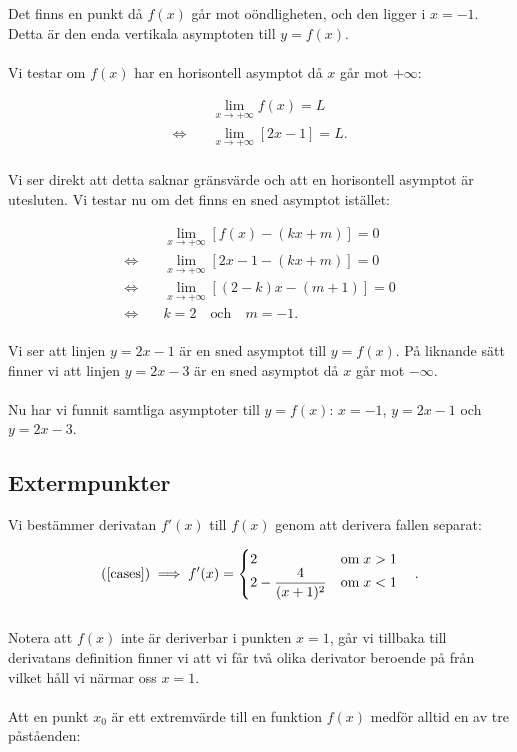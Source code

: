\documentclass{article}
\begin{document}
\noindent Det finns en punkt då $f(x)$ går mot oöndligheten, och den ligger i $x = -1$. Detta är den enda vertikala asymptoten till $y = f(x)$.
\\
\\
Vi testar om $f(x)$ har en horisontell asymptot då $x$ går mot $+\infty$:

\begin{align*}
  & \lim_{x \to +\infty}f(x) = L\\
  \iff \quad & \lim_{x \to +\infty}[2x - 1] = L\text{.}
\end{align*}
\\
Vi ser direkt att detta saknar gränsvärde och att en horisontell asymptot är utesluten. Vi testar nu om det finns en sned asymptot istället:

\begin{align*}
  & \lim_{x \to +\infty}[f(x) - (kx + m)] = 0\\
  \iff \quad & \lim_{x \to +\infty}[2x - 1 - (kx + m)] = 0\\
  \iff \quad & \lim_{x \to +\infty}[(2 - k)x - (m + 1)] = 0\\
  \iff \quad & k = 2 \quad \text{och} \quad m = -1\text{.}
\end{align*}
\\
Vi ser att linjen $y = 2x - 1$ är en sned asymptot till $y = f(x)$. På liknande sätt finner vi att linjen $y = 2x -3$ är en sned asymptot då $x$ går mot $-\infty$.
\\
\\
Nu har vi funnit samtliga asymptoter till $y = f(x)$: $x = -1$, $y = 2x -1$ och $y = 2x - 3$.


\subsection*{Extermpunkter}

\noindent Vi bestämmer derivatan $f'(x)$ till $f(x)$ genom att derivera fallen separat:

\begin{gather*}
  \text{(\ref{cases})} \implies f'(x) =
  \begin{cases}
    \begin{aligned}[t]
      & 2 & \text{om} \; x > 1 \\
      & 2 - \frac{4}{(x + 1)^{2}} & \text{om} \; x < 1
    \end{aligned}
  \end{cases}\text{.}
\end{gather*}
\\
Notera att $f(x)$ inte är deriverbar i punkten $x = 1$, går vi tillbaka till derivatans definition finner vi att vi får två olika derivator beroende på från vilket håll vi närmar oss $x = 1$.
\\
\\
Att en punkt $x_{0}$ är ett extremvärde till en funktion $f(x)$ medför alltid en av tre påståenden:
\end{document}
